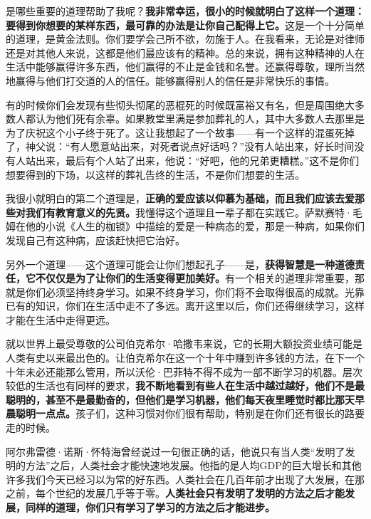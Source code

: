 是哪些重要的道理帮助了我呢？\textbf{我非常幸运，很小的时候就明白了这样一个道理：要得到你想要的某样东西，最可靠的办法是让你自己配得上它。}这是一个十分简单的道理，是黄金法则。你们要学会己所不欲，勿施于人。在我看来，无论是对律师还是对其他人来说，这都是他们最应该有的精神。总的来说，拥有这种精神的人在生活中能够赢得许多东西，他们赢得的不止是金钱和名誉。还赢得尊敬，理所当然地赢得与他们打交道的人的信任。能够赢得别人的信任是非常快乐的事情。
\par

有的时候你们会发现有些彻头彻尾的恶棍死的时候既富裕又有名，但是周围绝大多数人都认为他们死有余辜。如果教堂里满是参加葬礼的人，其中大多数人去那里是为了庆祝这个小子终于死了。这让我想起了一个故事——有一个这样的混蛋死掉了，神父说：“有人愿意站出来，对死者说点好话吗？”没有人站出来，好长时间没有人站出来，最后有个人站了出来，他说：“好吧，他的兄弟更糟糕。”这不是你们想要得到的下场，以这样的葬礼告终的生活，不是你们想要的生活。
\par

我很小就明白的第二个道理是，\textbf{正确的爱应该以仰慕为基础，而且我们应该去爱那些对我们有教育意义的先贤。}我懂得这个道理且一辈子都在实践它。萨默赛特·毛姆在他的小说《人生的枷锁》中描绘的爱是一种病态的爱，那是一种病，如果你们发现自己有这种病，应该赶快把它治好。
\par

另外一个道理——这个道理可能会让你们想起孔子——是，\textbf{获得智慧是一种道德责任，它不仅仅是为了让你们的生活变得更加美好。}有一个相关的道理非常重要，那就是你们必须坚持终身学习。如果不终身学习，你们将不会取得很高的成就。光靠已有的知识，你们在生活中走不了多远。离开这里以后，你们还得继续学习，这样才能在生活中走得更远。
\par

就以世界上最受尊敬的公司伯克希尔·哈撒韦来说，它的长期大额投资业绩可能是人类有史以来最出色的。让伯克希尔在这一个十年中赚到许多钱的方法，在下一个十年未必还能那么管用，所以沃伦·巴菲特不得不成为一部不断学习的机器。层次较低的生活也有同样的要求，\textbf{我不断地看到有些人在生活中越过越好，他们不是最聪明的，甚至不是最勤奋的，但他们是学习机器，他们每天夜里睡觉时都比那天早晨聪明一点点。}孩子们，这种习惯对你们很有帮助，特别是在你们还有很长的路要走的时候。
\par

阿尔弗雷德·诺斯·怀特海曾经说过一句很正确的话，他说只有当人类“发明了发明的方法”之后，人类社会才能快速地发展。他指的是人均GDP的巨大增长和其他许多我们今天已经习以为常的好东西。人类社会在几百年前才出现了大发展，在那之前，每个世纪的发展几乎等于零。\textbf{人类社会只有发明了发明的方法之后才能发展，同样的道理，你们只有学习了学习的方法之后才能进步。}
\par

